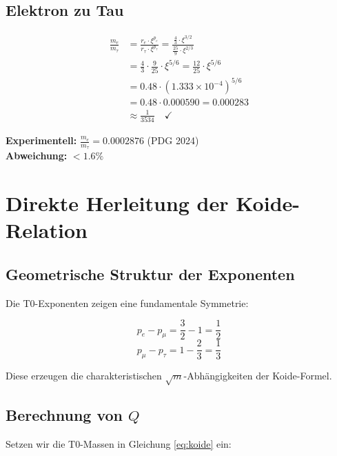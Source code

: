 	\subsection{Elektron zu Tau}
	
	\begin{beweis}
		\begin{align}
			\frac{m_e}{m_\tau} &= \frac{r_e \cdot \xi^{p_e}}{r_\tau \cdot \xi^{p_\tau}} = \frac{\frac{4}{3} \cdot \xi^{3/2}}{\frac{25}{9} \cdot \xi^{2/3}} \\
			&= \frac{4}{3} \cdot \frac{9}{25} \cdot \xi^{5/6} = \frac{12}{25} \cdot \xi^{5/6} \\
			&= 0.48 \cdot (1.333 \times 10^{-4})^{5/6} \\
			&= 0.48 \cdot 0.000590 = 0.000283 \\
			&\approx \frac{1}{3534} \quad \checkmark
		\end{align}
		
		\textbf{Experimentell:} $\frac{m_e}{m_\tau} = 0.0002876$ (PDG 2024)\\
		\textbf{Abweichung:} $< 1.6\%$
	\end{beweis}
	
	\section{Direkte Herleitung der Koide-Relation}
	
	\subsection{Geometrische Struktur der Exponenten}
	
	Die T0-Exponenten zeigen eine fundamentale Symmetrie:
	
	\begin{equation}
		p_e - p_\mu = \frac{3}{2} - 1 = \frac{1}{2}
	\end{equation}
	\begin{equation}
		p_\mu - p_\tau = 1 - \frac{2}{3} = \frac{1}{3}
	\end{equation}
	
	Diese erzeugen die charakteristischen $\sqrt{m}$-Abhängigkeiten der Koide-Formel.
	
	\subsection{Berechnung von $Q$}
	
	Setzen wir die T0-Massen in Gleichung \eqref{eq:koide} ein:
	
